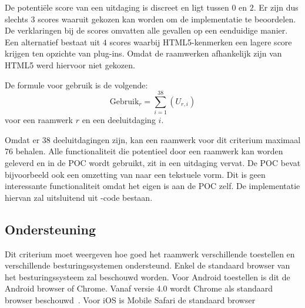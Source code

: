 De potentiële score van een uitdaging is discreet en ligt tussen $0$ en $2$.
Er zijn dus slechts $3$ scores waaruit gekozen kan worden om de implementatie te beoordelen.
De verklaringen bij de scores omvatten alle gevallen op een eenduidige manier.
Een alternatief bestaat uit $4$ scores waarbij HTML5-kenmerken een lagere score krijgen ten opzichte van plug-ins.
Omdat de raamwerken afhankelijk zijn van HTML5 werd hiervoor niet gekozen.

De formule voor gebruik is de volgende:
\begin{equation}
  \text{Gebruik}_r = \sum_{i=1}^{38}{\left(U_{r,i}\right)}
  \label{eq:gebruik}
\end{equation}
voor een raamwerk $r$ en een deeluitdaging $i$.

Omdat er $38$ deeluitdagingen zijn, kan een raamwerk voor dit criterium maximaal $76$ behalen.
Alle functionaliteit die potentieel door een raamwerk kan worden geleverd en in de POC wordt gebruikt, zit in een uitdaging vervat.  
De POC bevat bijvoorbeeld ook een omzetting van  naar een tekstuele vorm.
Dit is geen interessante functionaliteit omdat het eigen is aan de POC zelf.
De implementatie hiervan zal uitsluitend uit \js{}-code bestaan.


\subsection{Ondersteuning}
\label{sec:vergelijking-ondersteuning}
Dit criterium moet weergeven hoe goed het raamwerk verschillende toestellen en verschillende besturingssystemen ondersteund.
Enkel de standaard browser van het besturingssysteem zal beschouwd worden.
Voor Android toestellen is dit de Android browser of Chrome.  
Vanaf versie 4.0 wordt Chrome als standaard browser beschouwd~\cite{Wimberly2008}.
Voor iOS is Mobile Safari de standaard browser


